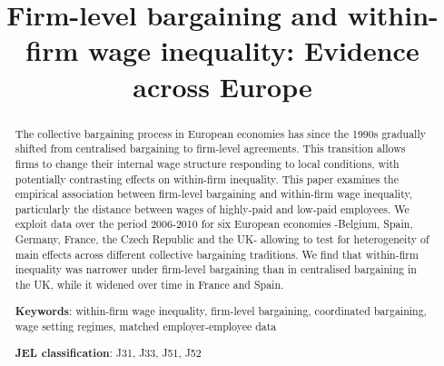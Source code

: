 \documentclass[12pt]{article}
\begin{document}
\title{Firm-level bargaining and within-firm wage inequality: Evidence across Europe}

\date{}




\maketitle

\begin{abstract}
The collective bargaining process in European economies has since the 1990s gradually shifted from centralised bargaining to firm-level agreements. This transition allows firms to change their internal wage structure responding to local conditions, with potentially contrasting effects on within-firm inequality. This paper examines the empirical association between firm-level bargaining and within-firm wage inequality, particularly the distance between wages of highly-paid and low-paid employees. We exploit data over the period 2006-2010 for six European economies -Belgium, Spain, Germany, France, the Czech Republic and the UK- allowing to test for heterogeneity of main effects across different collective bargaining traditions. We find that within-firm inequality was narrower under firm-level bargaining than in centralised bargaining in the UK, while it widened over time in France and Spain.
\bigskip
 
\noindent \textbf{Keywords}: within-firm wage inequality, firm-level bargaining, coordinated bargaining, wage setting regimes, matched employer-employee data


\noindent \textbf{JEL classification}: J31, J33, J51, J52

\end{abstract}
\end{document}
